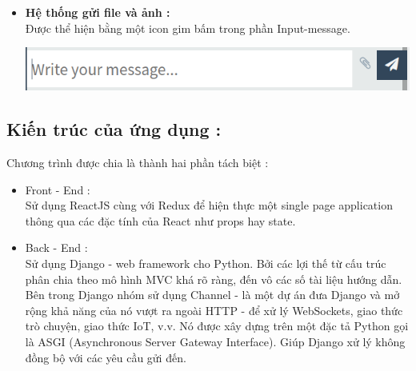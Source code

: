 \documentclass[a4paper]{article}
\begin{document}
\begin{itemize}
\begin{center}
			\end{center}
		\item \textbf{Hệ thống gửi file và ảnh :} \\
		Được thể hiện bằng một icon gim bấm trong phần Input-message.
			\begin{center}
				\includegraphics[scale=0.5]{Images/chatinput.png}
			\end{center}
	\end{itemize}
	\subsection{Kiến trúc của ứng dụng : }
	Chương trình được chia là thành hai phần tách biệt : 
		\begin{itemize}
			\item Front - End : \\
			Sử dụng ReactJS cùng với Redux để hiện thực một single page application	thông qua các đặc tính của React như props hay state.
			\item Back - End : \\
			Sử dụng Django - web framework cho Python. Bởi các lợi thế từ cấu trúc phân chia theo mô hình MVC khá rõ ràng, đến vô các số tài liệu hướng dẫn. \\
			Bên trong Django nhóm sử dụng Channel - là một dự án đưa Django và mở rộng khả năng của nó vượt ra ngoài HTTP - để xử lý WebSockets, giao thức trò chuyện, giao thức IoT, v.v. Nó được xây dựng trên một đặc tả Python gọi là ASGI (Asynchronous Server Gateway Interface). Giúp Django xử lý không đồng bộ với các yêu cầu gửi đến.			
			
			
		\end{itemize}

\end{document}
